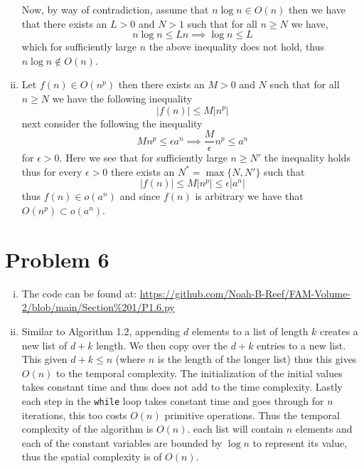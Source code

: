 \documentclass[12pt]{report}
\begin{document}
\begin{enumerate}[(i)]
    Now, by way of contradiction, assume that $n\log n \in O(n)$ then we have that there exists an $L > 0$ and $N > 1$ such that for all $n \geq N$ we have,
    \begin{equation*}
        n\log n \leq Ln \implies \log n \leq L
    \end{equation*}
    which for sufficiently large $n$ the above inequality does not hold, thus $n\log n \not\in O(n)$.
    \item Let $f(n) \in O(n^p)$ then there exists an $M > 0$ and $N$ such that for all $n \geq N$ we have the following inequality
    \begin{equation*}
        |f(n)| \leq M|n^p|
    \end{equation*}
    next consider the following the inequality
    \begin{equation*}
        Mn^p \leq \epsilon a^n \implies \frac{M}{\epsilon}n^p \leq a^n
    \end{equation*}
    for $\epsilon > 0$. Here we see that for sufficiently large $n \geq N'$ the inequality holds thus for every $\epsilon > 0$ there exists an $N^* = \max\{N,N'\}$ such that
    \begin{equation*}
         |f(n)| \leq M|n^p| \leq \epsilon|a^n|
    \end{equation*}
    thus $f(n) \in o(a^n)$ and since $f(n)$ is arbitrary we have that $O(n^p) \subset o(a^n)$.
\end{enumerate}

\section*{Problem 6}
\begin{enumerate}[(i)]
    \item The code can be found at: \url{https://github.com/Noah-B-Reef/FAM-Volume-2/blob/main/Section%201/P1.6.py}
    
    \item Similar to Algorithm 1.2, appending $d$ elements to a list of length $k$ creates a new list of $d + k$ length. We then copy over the $d + k$ entries to a new list. This given $d + k \leq n$ (where $n$ is the length of the longer list) thus this gives $O(n)$ to the temporal complexity. The initialization of the initial values takes constant time and thus does not add to the time complexity. Lastly each step in the \texttt{while} loop takes constant time and goes through for $n$ iterations, this too costs $O(n)$ primitive operations. Thus the temporal complexity of the algorithm is $O(n)$.
    each list will contain $n$ elements and each of the constant variables are bounded by $\log n$ to represent its value, thus the spatial complexity is of $O(n)$.
\end{enumerate}
\end{document}

